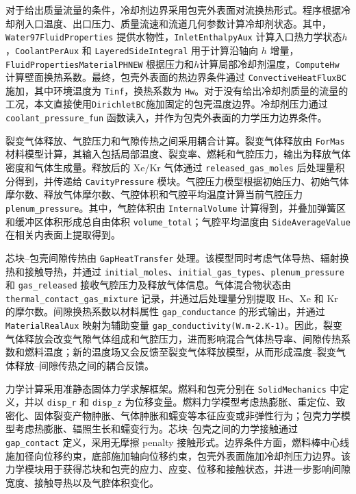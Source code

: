 对于给出质量流量的条件，冷却剂边界采用包壳外表面对流换热形式。程序根据冷却剂入口温度、出口压力、质量流速和流道几何参数计算冷却剂状态。其中，\texttt{Water97\allowbreak FluidProperties} 提供水物性，\texttt{InletEnthalpyAux} 计算入口热力学状态$h$，\texttt{CoolantPerAux} 和 \texttt{LayeredSideIntegral} 用于计算沿轴向 $h$ 增量，\texttt{FluidPropertiesMaterialPHNEW} 根据压力和$h$计算局部冷却剂温度，\texttt{ComputeHw} 计算壁面换热系数。最终，包壳外表面的热边界条件通过 \texttt{Convective\allowbreak HeatFluxBC} 施加，其中环境温度为 \texttt{Tinf}，换热系数为 \texttt{Hw}。对于没有给出冷却剂质量的流量的工况，本文直接使用\texttt{DirichletBC}施加固定的包壳温度边界。冷却剂压力通过 \texttt{coolant\_pressure\_fun} 函数读入，并作为包壳外表面的力学压力边界条件。

裂变气体释放、气腔压力和气隙传热之间采用耦合计算。裂变气体释放由 \texttt{ForMas} 材料模型计算，其输入包括局部温度、裂变率、燃耗和气腔压力，输出为释放气体密度和气体生成量。释放后的 Xe/Kr 气体通过 \texttt{released\_gas\_moles} 后处理量积分得到，并传递给 \texttt{CavityPressure} 模块。气腔压力模型根据初始压力、初始气体摩尔数、释放气体摩尔数、气腔体积和气腔平均温度计算当前气腔压力 \texttt{plenum\_pressure}。其中，气腔体积由 \texttt{InternalVolume} 计算得到，并叠加弹簧区和缓冲区体积形成总自由体积 \texttt{volume\_total}；气腔平均温度由 \texttt{SideAverageValue} 在相关内表面上提取得到。

芯块--包壳间隙传热由 \texttt{GapHeatTransfer} 处理。该模型同时考虑气体导热、辐射换热和接触导热，并通过 \texttt{initial\_moles}、\texttt{initial\_gas\_types}、\texttt{plenum\_pressure} 和 \texttt{gas\_released} 接收气腔压力及释放气体信息。气体混合物状态由 \texttt{thermal\_\allowbreak contact\_\allowbreak gas\_\allowbreak mixture} 记录，并通过后处理量分别提取 He、Xe 和 Kr 的摩尔数。间隙换热系数以材料属性 \texttt{gap\_\allowbreak conductance} 的形式输出，并通过 \texttt{MaterialRealAux} 映射为辅助变量 \texttt{gap\_\allowbreak conductivity(W.m-2.K-1)}。因此，裂变气体释放会改变气隙气体组成和气腔压力，进而影响混合气体热导率、间隙传热系数和燃料温度；新的温度场又会反馈至裂变气体释放模型，从而形成温度--裂变气体释放--间隙传热之间的耦合反馈。

力学计算采用准静态固体力学求解框架。燃料和包壳分别在 \texttt{SolidMechanics} 中定义，并以 \texttt{disp\_r} 和 \texttt{disp\_z} 为位移变量。燃料力学模型考虑热膨胀、重定位、致密化、固体裂变产物肿胀、气体肿胀和蠕变等本征应变或非弹性行为；包壳力学模型考虑热膨胀、辐照生长和蠕变行为。芯块--包壳之间的力学接触通过 \texttt{gap\_contact} 定义，采用无摩擦 penalty 接触形式。边界条件方面，燃料棒中心线施加径向位移约束，底部施加轴向位移约束，包壳外表面施加冷却剂压力边界。该力学模块用于获得芯块和包壳的应力、应变、位移和接触状态，并进一步影响间隙宽度、接触导热以及气腔体积变化。

